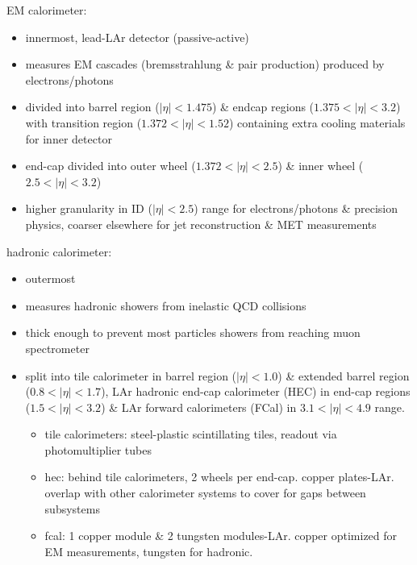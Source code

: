 \documentclass[../thesis.tex]{subfiles}
\begin{document}
\begin{multicols}{2}
EM calorimeter: 
\begin{itemize}
\item innermost, lead-LAr detector (passive-active)
\item measures EM cascades (bremsstrahlung \& pair production) produced by electrons/photons
\item divided into barrel region ($|\eta|<1.475$) \& endcap regions ($1.375<|\eta|<3.2$) with transition region ($1.372<|\eta|<1.52$) containing extra cooling materials for inner detector
\item end-cap divided into outer wheel ($1.372<|\eta|<2.5$) \& inner wheel ($2.5<|\eta|<3.2$)
\item higher granularity in ID ($|\eta|<2.5$) range for electrons/photons \& precision physics, coarser elsewhere for jet reconstruction \& MET measurements
\end{itemize}

hadronic calorimeter: 
\begin{itemize}
\item outermost
\item measures hadronic showers from inelastic QCD collisions
\item thick enough to prevent most particles showers from reaching muon spectrometer
\item split into tile calorimeter in barrel region ($|\eta|<1.0$) \& extended barrel region ($0.8<|\eta|<1.7$), LAr hadronic end-cap calorimeter (HEC) in end-cap regions ($1.5<|\eta|<3.2$)  \& LAr forward calorimeters (FCal) in $3.1<|\eta|<4.9$ range.

\begin{itemize}
\item tile calorimeters: steel-plastic scintillating tiles, readout via photomultiplier tubes
\item hec: behind tile calorimeters, 2 wheels per end-cap. copper plates-LAr. overlap with other calorimeter systems to cover for gaps between subsystems
\item fcal: 1 copper module \& 2 tungsten modules-LAr. copper optimized for EM measurements, tungsten for hadronic.
\end{itemize}
\end{itemize}
\end{multicols}
\end{document}
